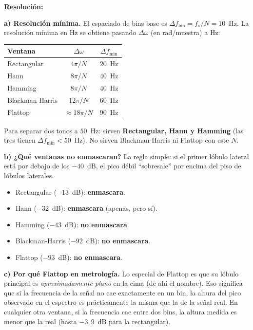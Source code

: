 \documentclass[11pt, a4paper]{article}
\newcommand{\res}{\smallskip\noindent\textbf{\color{enunline}Resoluci\'on:}\smallskip}
\begin{document}
\res

\textbf{a) Resoluci\'on m\'inima.}
El espaciado de bins base es $\Delta f_{\text{bin}} = f_s/N = 10$~Hz.
La resoluci\'on m\'inima en Hz se obtiene pasando $\Delta\omega$ (en rad/muestra)
a Hz:

\begin{center}
\begin{tabular}{lcc}
\toprule
Ventana & $\Delta\omega$ & $\Delta f_{\min}$ \\
\midrule
Rectangular     & $4\pi/N$   & $20$~Hz \\
Hann            & $8\pi/N$   & $40$~Hz \\
Hamming         & $8\pi/N$   & $40$~Hz \\
Blackman-Harris & $12\pi/N$  & $60$~Hz \\
Flattop         & $\approx 18\pi/N$ & $90$~Hz \\
\bottomrule
\end{tabular}
\end{center}

Para separar dos tonos a $50$~Hz:
sirven \textbf{Rectangular, Hann y Hamming} (las tres tienen $\Delta f_{\min} < 50$~Hz).
No sirven Blackman-Harris ni Flattop con este $N$.

\textbf{b) ¿Qu\'e ventanas no enmascaran?}
La regla simple: si el primer l\'obulo lateral est\'a por debajo de los $-40$~dB,
el pico d\'ebil ``sobresale'' por encima del piso de l\'obulos laterales.

\begin{itemize}
  \item Rectangular ($-13$~dB): \textbf{enmascara}.
  \item Hann ($-32$~dB): \textbf{enmascara} (apenas, pero s\'i).
  \item Hamming ($-43$~dB): \textbf{no enmascara}.
  \item Blackman-Harris ($-92$~dB): \textbf{no enmascara}.
  \item Flattop ($-93$~dB): \textbf{no enmascara}.
\end{itemize}

\textbf{c) Por qu\'e Flattop en metrolog\'ia.}
Lo especial de Flattop es que su l\'obulo principal es \emph{aproximadamente plano} en la cima
(de ah\'i el nombre).
Eso significa que si la frecuencia de la se\~nal no cae exactamente en un bin,
la altura del pico observado en el espectro es pr\'acticamente la misma que la
de la se\~nal real.
En cualquier otra ventana, si la frecuencia cae entre dos bins, la altura
medida es menor que la real (hasta $-3{,}9$~dB para la rectangular).
\end{document}

